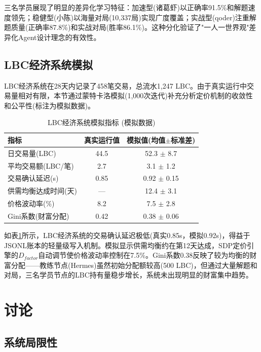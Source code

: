 \documentclass[12pt,a4paper]{ctexart}
\begin{document}
三名学员展现了明显的差异化学习特征：加速型(诸葛虾)以正确率91.5\%和解题速度领先；稳健型(小陈)以海量对局(10,337局)实现广度覆盖；实战型(qoder)注重解题质量(正确率87.8\%)和实战对局(胜率86.1\%)。这种分化验证了"一人一世界观"差异化Agent设计理念的有效性。

\subsection{LBC经济系统模拟}

LBC经济系统在28天内记录了458笔交易，总流水1,247 LBC。由于真实运行中交易量相对有限，本节通过蒙特卡洛模拟(1,000次迭代)补充分析定价机制的收敛性和公平性(标注为模拟数据)。

\begin{table}[H]
\centering
\caption{LBC经济系统模拟指标 (模拟数据)}
\label{tab:lbc}
\begin{tabular}{lcc}
\toprule
指标 & 真实运行值 & 模拟值(均值$\pm$标准差) \\
\midrule
日交易量(LBC) & 44.5 & 52.3 $\pm$ 8.7 \\
平均交易额(LBC/笔) & 2.7 & 3.1 $\pm$ 1.2 \\
交易确认延迟(s) & 0.85 & 0.92 $\pm$ 0.15 \\
供需均衡达成时间(天) & — & 12.4 $\pm$ 3.1 \\
价格波动率(\%) & 8.2 & 7.5 $\pm$ 2.8 \\
Gini系数(财富分配) & 0.42 & 0.38 $\pm$ 0.06 \\
\bottomrule
\end{tabular}
\end{table}

如表\ref{tab:lbc}所示，LBC经济系统的交易确认延迟极低(真实0.85s，模拟0.92s)，得益于JSONL账本的轻量级写入机制。模拟显示供需均衡约在第12天达成，SDP定价引擎的$D_{factor}$自动调节使价格波动率控制在7.5\%。Gini系数0.38反映了较为均衡的财富分配——教练节点(Hermes)虽然初始分配额较高(500 LBC)，但通过大量解题和对局，三名学员节点的LBC持有量稳步增长，系统未出现明显的财富集中趋势。

\section{讨论}

\subsection{系统局限性}
\end{document}
